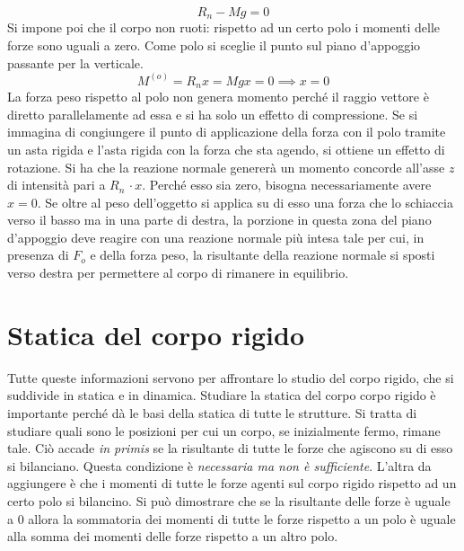 \documentclass[10pt,a4paper]{book}
\begin{document}
\[
	R_n-Mg=0
\]
Si impone poi che il corpo non ruoti: rispetto ad un certo polo i momenti delle forze sono uguali a zero. Come polo si sceglie il punto sul piano d'appoggio passante per la verticale.
\[
	M^{(o)} = R_n x = Mgx =0 \implies x=0
\]
La forza peso rispetto al polo non genera momento perché il raggio vettore è diretto parallelamente ad essa e si ha solo un effetto di compressione. Se si immagina di congiungere il punto di applicazione della forza con il polo tramite un asta rigida e l'asta rigida con la forza che sta agendo, si ottiene un effetto di rotazione. Si ha che la reazione normale genererà un momento concorde all'asse $z$ di intensità pari a $R_n\,\cdot x$.
Perché esso sia zero, bisogna necessariamente avere $x=0$. Se oltre al peso dell'oggetto si applica su di esso una forza che lo schiaccia verso il basso ma in una parte di destra, la porzione in questa zona del piano d'appoggio deve reagire con una reazione normale più intesa tale per cui, in presenza di $F_o$ e della forza peso, la risultante della reazione normale si sposti verso destra per permettere al corpo di rimanere in equilibrio.







































\section{Statica del corpo rigido}

Tutte queste informazioni servono per affrontare lo studio del corpo rigido, che si suddivide in statica e in dinamica.
Studiare la statica del corpo corpo rigido è importante perché dà le basi della statica di tutte le strutture. Si tratta di studiare quali sono le posizioni per cui un corpo, se inizialmente fermo, rimane tale. Ciò accade \textit{in primis} se la risultante di tutte le forze che agiscono su di esso si bilanciano. Questa condizione è \emph{necessaria ma non è sufficiente}. L'altra da aggiungere è che i momenti di tutte le forze agenti sul corpo rigido rispetto ad un certo polo si bilancino. Si può dimostrare che se la risultante delle forze è uguale a $0$ allora la sommatoria dei momenti di tutte le forze rispetto a un polo è uguale alla somma dei momenti delle forze rispetto a un altro polo.
\end{document}
